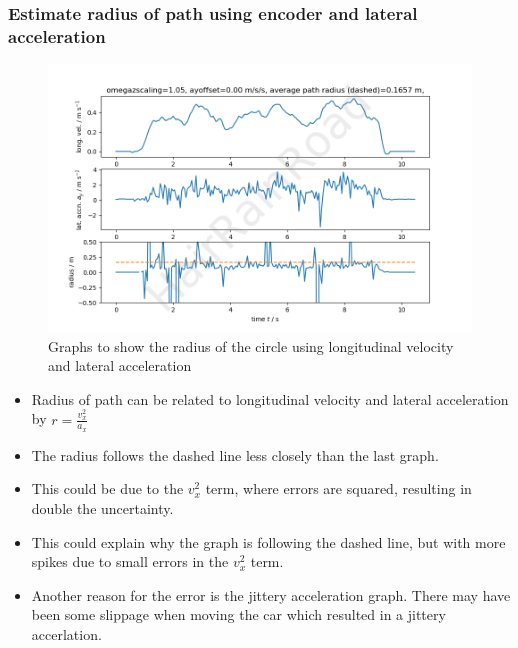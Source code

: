 \documentclass[12pt]{article}
\begin{document}
    \subsubsection{Estimate radius of path using encoder and lateral acceleration}
    \begin{figure}[H]
        \captionsetup{labelfont=bf}
        \includegraphics[width=40pc]{fig6png.png}
        \caption{Graphs to show the radius of the circle using longitudinal velocity and lateral acceleration}\label{figure6}
    \end{figure}
    \begin{itemize}
        \item Radius of path can be related to longitudinal velocity and lateral acceleration by $r = \frac{v_x^2}{a_x}$
        \item The radius follows the dashed line less closely than the last graph.
        \item This could be due to the $v_x^2$ term, where errors are squared, resulting in double the uncertainty.
        \item This could explain why the graph is following the dashed line, but with more spikes due to small errors in the $v_x^2$ term.
        \item Another reason for the error is the jittery acceleration graph. There may have been some slippage when moving the car
        which resulted in a jittery accerlation.
    \end{itemize}
    \newpage
\end{document}
